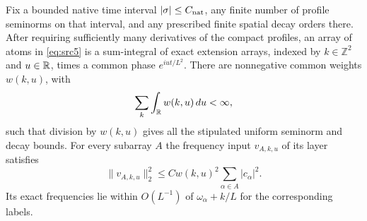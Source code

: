 \begin{lemma}\label{lem:sparse-layers}
Fix a bounded native time interval $|\sigma|\le C_{\rm nat}$, any finite
number of profile seminorms on that interval, and any prescribed finite
spatial decay orders there.  After requiring sufficiently many derivatives of the
compact profiles, an array of atoms in \eqref{eq:src5} is a sum-integral
of exact extension arrays, indexed by $k\in\mathbb Z^2$ and $u\in\mathbb R$,
times a common phase $e^{iu t/L^2}$.  There are nonnegative common weights
$w(k,u)$, with
\[
 \sum_k\int_\mathbb R w(k,u)\,du<\infty,
\]
such that division by $w(k,u)$ gives all the stipulated uniform
seminorm and decay bounds.  For every subarray $A$ the frequency input
$v_{A,k,u}$ of its layer satisfies
\begin{equation}\label{eq:sparse-layer-energy}
 \|v_{A,k,u}\|_2^2
    \le C w(k,u)^2\sum_{\alpha\in A}|c_\alpha|^2.
\end{equation}
Its exact frequencies lie within $O(L^{-1})$ of
$\omega_\alpha+k/L$ for the corresponding labels.
\end{lemma}

